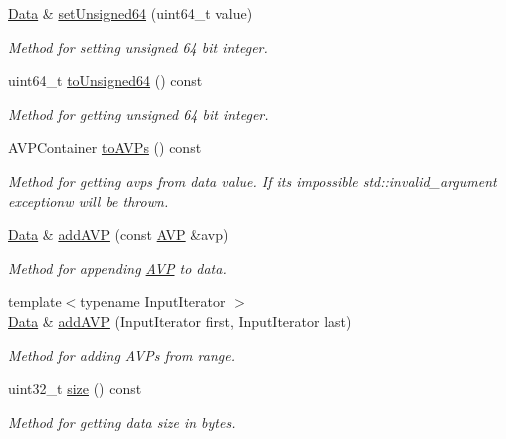 \begin{DoxyCompactItemize}
\hyperlink{classDiameter_1_1AVP_1_1Data}{Data} \& \hyperlink{classDiameter_1_1AVP_1_1Data_a6d04d160fd5093e2b68300d4dc5a6839}{set\+Unsigned64} (uint64\+\_\+t value)
\begin{DoxyCompactList}\small\item\em Method for setting unsigned 64 bit integer. \end{DoxyCompactList}\item 
uint64\+\_\+t \hyperlink{classDiameter_1_1AVP_1_1Data_a57371b621b2e27eb2988b232f5a84a43}{to\+Unsigned64} () const
\begin{DoxyCompactList}\small\item\em Method for getting unsigned 64 bit integer. \end{DoxyCompactList}\item 
A\+V\+P\+Container \hyperlink{classDiameter_1_1AVP_1_1Data_ab62da271ed4bab26b26e497cc33e5955}{to\+A\+V\+Ps} () const
\begin{DoxyCompactList}\small\item\em Method for getting avps from data value. If it\textquotesingle{}s impossible std\+::invalid\+\_\+argument exceptionw will be thrown. \end{DoxyCompactList}\item 
\hyperlink{classDiameter_1_1AVP_1_1Data}{Data} \& \hyperlink{classDiameter_1_1AVP_1_1Data_a7d9aba7586083a93c48dd872396cb0e1}{add\+A\+VP} (const \hyperlink{classDiameter_1_1AVP}{A\+VP} \&avp)
\begin{DoxyCompactList}\small\item\em Method for appending \hyperlink{classDiameter_1_1AVP}{A\+VP} to data. \end{DoxyCompactList}\item 
{\footnotesize template$<$typename Input\+Iterator $>$ }\\\hyperlink{classDiameter_1_1AVP_1_1Data}{Data} \& \hyperlink{classDiameter_1_1AVP_1_1Data_a36ab07b5614a88fad586d67c5c6155aa}{add\+A\+VP} (Input\+Iterator first, Input\+Iterator last)
\begin{DoxyCompactList}\small\item\em Method for adding A\+V\+Ps from range. \end{DoxyCompactList}\item 
uint32\+\_\+t \hyperlink{classDiameter_1_1AVP_1_1Data_a5ba282bdc28fe77ef680bba192a57d2c}{size} () const
\begin{DoxyCompactList}\small\item\em Method for getting data size in bytes. \end{DoxyCompactList}\item 

\end{DoxyCompactItemize}
